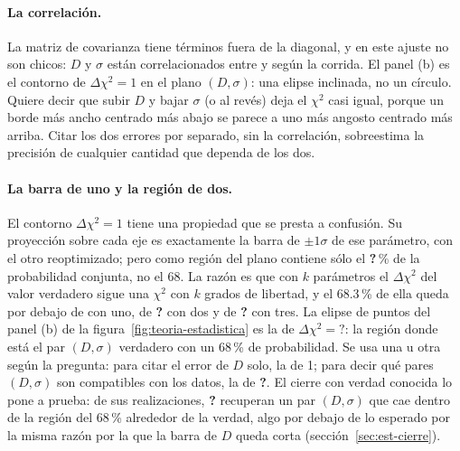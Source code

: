 \documentclass[11pt,a4paper]{article}
\newcommand{\faltaMacro}{\textbf{?}}
\providecommand{\DeltaChiDosD}{\faltaMacro}\providecommand{\DeltaChiTresD}{\faltaMacro}
\providecommand{\ProbElipseUno}{\faltaMacro}\providecommand{\NErrorParche}{\faltaMacro}
\providecommand{\CierreDentroElipse}{\faltaMacro}
\begin{document}
\paragraph{La correlación.} La matriz de covarianza tiene términos fuera de
la diagonal, y en este ajuste no son chicos: $D$ y $\sigma$ están
correlacionados entre \CorrMin{} y \CorrMax{} según la corrida. El panel (b)
es el contorno de $\Delta\chi^2 = 1$ en el plano $(D, \sigma)$: una elipse
inclinada, no un círculo. Quiere decir que subir $D$ y bajar $\sigma$ (o al
revés) deja el $\chi^2$ casi igual, porque un borde más ancho centrado más
abajo se parece a uno más angosto centrado más arriba. Citar los dos errores
por separado, sin la correlación, sobreestima la precisión de cualquier
cantidad que dependa de los dos.

\paragraph{La barra de uno y la región de dos.} El contorno
$\Delta\chi^2 = 1$ tiene una propiedad que se presta a confusión. Su
proyección sobre cada eje es exactamente la barra de $\pm1\sigma$ de ese
parámetro, con el otro reoptimizado; pero como región del plano contiene sólo
el \ProbElipseUno\,\% de la probabilidad conjunta, no el 68. La razón es que
con $k$ parámetros el $\Delta\chi^2$ del valor verdadero sigue una $\chi^2$
con $k$ grados de libertad, y el 68.3\,\% de ella queda por debajo de
\DeltaChiUnoD{} con uno, de \DeltaChiDosD{} con dos y de \DeltaChiTresD{} con
tres. La elipse de puntos del panel (b) de la
figura~\ref{fig:teoria-estadistica} es la de $\Delta\chi^2 = \DeltaChiDosD$:
la región donde está el par $(D, \sigma)$ verdadero con un 68\,\% de
probabilidad. Se usa una u otra según la pregunta: para citar el error de
$D$ solo, la de 1; para decir qué pares $(D, \sigma)$ son compatibles con los
datos, la de \DeltaChiDosD. El cierre con verdad conocida lo pone a prueba:
de sus \CierreN{} realizaciones, \CierreDentroElipse{} recuperan un par
$(D, \sigma)$ que cae dentro de la región del 68\,\% alrededor de la verdad,
algo por debajo de lo esperado por la misma razón por la que la barra de $D$
queda corta (sección~\ref{sec:est-cierre}).
\end{document}
